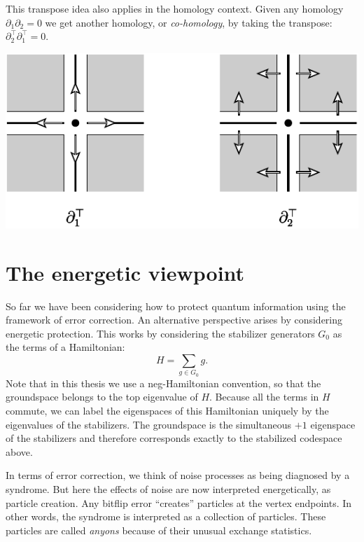 \documentclass[11pt,oneside]{report}
\newcommand{\danbrowne}[1]{\ \textcolor{red}{\{#1\}}\ }
\begin{document}
This transpose idea also applies in the homology context.
Given any homology $\partial_1 \partial_2 = 0$
we get another homology, or \emph{co-homology}, by taking the transpose:
$\partial_2^\top \partial_1^\top = 0.$
\begin{center}
\includegraphics{pic-cobdy.pdf}
\end{center}




\section{The energetic viewpoint}

So far we have been considering how to protect quantum information
using the framework of error correction.
An alternative perspective arises by considering energetic
protection.
This works by considering the stabilizer generators $G_0$ as
the terms of a Hamiltonian:
$$
    H = \sum_{g\in G_0} g.
$$
Note that in this thesis we use a neg-Hamiltonian convention,
so that the groundspace belongs to the top eigenvalue of $H$.
Because all the terms in $H$ commute, we can label the eigenspaces of
this Hamiltonian uniquely by the eigenvalues of the stabilizers.
The groundspace is the simultaneous $+1$ eigenspace of the stabilizers
and therefore corresponds exactly to the stabilized codespace above.

In terms of error correction,
we think of noise processes as being diagnosed by a syndrome. 
But here the
effects of noise are now interpreted energetically, as particle creation.
Any bitflip error ``creates'' particles at the vertex endpoints.
In other words, the syndrome is interpreted as a collection of particles.
These particles are called \emph{anyons}
because of their unusual exchange statistics.
\end{document}
